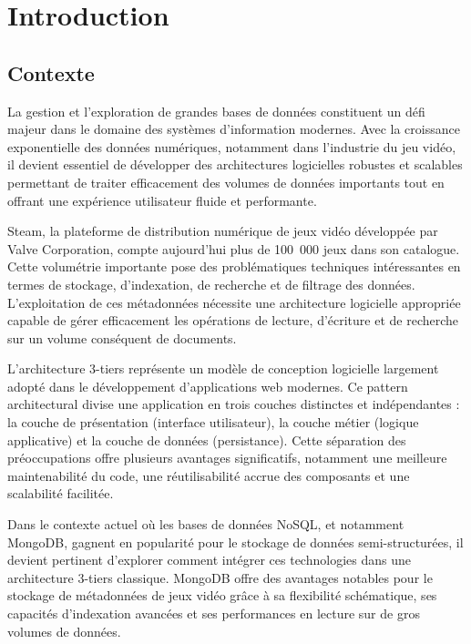 \chapter{Introduction}
\label{ch:into}

\section{Contexte}
\label{sec:into_back}

La gestion et l'exploration de grandes bases de données constituent un défi majeur dans le domaine des systèmes d'information modernes. Avec la croissance exponentielle des données numériques, notamment dans l'industrie du jeu vidéo, il devient essentiel de développer des architectures logicielles robustes et scalables permettant de traiter efficacement des volumes de données importants tout en offrant une expérience utilisateur fluide et performante.

Steam, la plateforme de distribution numérique de jeux vidéo développée par Valve Corporation, compte aujourd'hui plus de 100~000 jeux dans son catalogue. Cette volumétrie importante pose des problématiques techniques intéressantes en termes de stockage, d'indexation, de recherche et de filtrage des données. L'exploitation de ces métadonnées nécessite une architecture logicielle appropriée capable de gérer efficacement les opérations de lecture, d'écriture et de recherche sur un volume conséquent de documents.

L'architecture 3-tiers représente un modèle de conception logicielle largement adopté dans le développement d'applications web modernes. Ce pattern architectural divise une application en trois couches distinctes et indépendantes : la couche de présentation (interface utilisateur), la couche métier (logique applicative) et la couche de données (persistance). Cette séparation des préoccupations offre plusieurs avantages significatifs, notamment une meilleure maintenabilité du code, une réutilisabilité accrue des composants et une scalabilité facilitée.

Dans le contexte actuel où les bases de données NoSQL, et notamment MongoDB, gagnent en popularité pour le stockage de données semi-structurées, il devient pertinent d'explorer comment intégrer ces technologies dans une architecture 3-tiers classique. MongoDB offre des avantages notables pour le stockage de métadonnées de jeux vidéo grâce à sa flexibilité schématique, ses capacités d'indexation avancées et ses performances en lecture sur de gros volumes de données.


